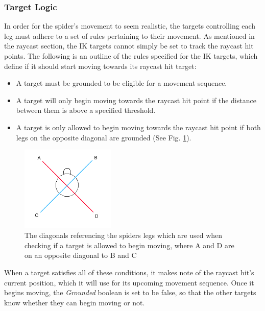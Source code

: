 \subsubsection{Target Logic}
In order for the spider's movement to seem realistic, the targets controlling
each leg must adhere to a set of rules pertaining to their movement. As
mentioned in the raycast section, the IK targets cannot simply be set to track
the raycast hit points. The following is an outline of the rules specified for
the IK targets, which define if it should start moving towards its raycast hit
target:
\begin{itemize}
    \item A target must be grounded to be eligible for a movement sequence.

    \item A target will only begin moving towards the raycast hit point if the
        distance between them is above a specified threshold.

    \item A target is only allowed to begin moving towards the raycast hit
        point if both legs on the opposite diagonal are grounded (See Fig.
        \ref{fig:diagonals}).
\end{itemize}


\begin{figure}
    \centering
    \captionsetup{justification=centering}
    \includegraphics[width=0.4\textwidth]{grafika/diagonals2.png}
    \caption{The diagonals referencing the spiders legs which are used when
    checking if a target is allowed to begin moving, where A and D are on an
opposite diagonal to B and C}
    \label{fig:diagonals}
\end{figure}

When a target satisfies all of these conditions, it makes note of the raycast
hit's current position, which it will use for its upcoming movement sequence.
Once it begins moving, the \textit{Grounded} boolean is set to be false, so that
the other targets know whether they can begin moving or not.


